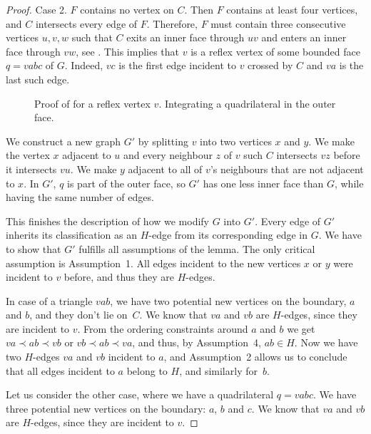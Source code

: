 \documentclass{patmorin}
\begin{document}
\begin{proof}
   
Case 2. $F$ contains no vertex on $C$.
Then $F$ contains at least four vertices, and $C$ intersects
   every edge of $F$.  Therefore,  
   $F$
    must contain three consecutive vertices
   $u,v,w$ such that $C$ exits an inner face through $uv$ and enters
   an inner face through $vw$, see .
  This implies that $v$ is a reflex vertex
   of some bounded face $q=vabc$ of $G$.  Indeed, $vc$ is the first edge
   incident to $v$ crossed by $C$ and $va$ is the last such edge.

  \begin{figure}
     \caption{Proof of  for a reflex
       vertex $v$. Integrating a quadrilateral in the outer face.}
  \end{figure}
   

   We construct a new graph $G'$ by splitting $v$ into two vertices $x$
   and $y$.  We make the vertex $x$ adjacent to $u$ and every neighbour
   $z$ of $v$ such $C$ intersects $vz$ before it intersects $vu$.  We make
   $y$ adjacent to all of $v$'s neighbours that are not adjacent to $x$.
   In $G'$, $q$ is part of the outer face, so $G'$ has one less inner
   face than $G$, while having the same number of edges.

   This finishes the description of how we modify $G$ into $G'$.
Every edge of $G'$ inherits its classification as an $H$-edge from
its corresponding edge in $G$.
   We have
to
show that $G'$ fulfills all assumptions of the lemma.
The only critical assumption is Assumption~1.
All edges incident to the new vertices $x$ or $y$ were incident to $v$
before, and thus they are $H$-edges.

In case of a triangle $vab$, we have two potential new vertices on the
boundary, $a$ and $b$, and they don't lie on~$C$. We know that $va$
and $vb$ are $H$-edges, since they are incident to $v$.
From the ordering constraints around $a$ and $b$ we get
$va\prec ab\prec vb$
or
$vb\prec ab\prec va$, and thus, by Assumption~4, $ab\in H$.
Now we have two $H$-edges $va$ and $vb$ incident to $a$,
and Assumption~2 allows us to conclude that all edges incident
to $a$ belong to $H$, and similarly for~$b$.
   
Let us consider the other case, where we have a quadrilateral 
$q=vabc$.
We have three potential new vertices on the
boundary: $a$, $b$ and $c$. We know that $va$
and $vb$ are $H$-edges, since they are incident to $v$.


\end{proof}
\end{document}
